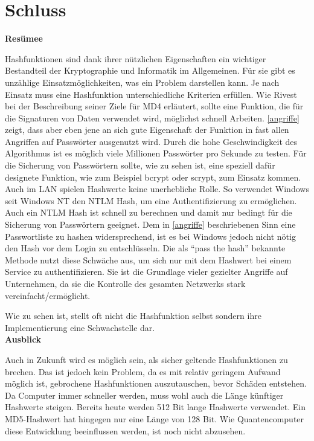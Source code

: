 \documentclass[12pt,a4paper]{scrartcl}
\numberwithin{equation}{section}
\numberwithin{myalgctr}{section}
\numberwithin{mytheoremctr}{section}
\begin{document}
	
	\newpage
	\section{Schluss}
	\textbf{Resümee}\par\noindent
	Hashfunktionen sind dank ihrer nützlichen Eigenschaften ein wichtiger Bestandteil der Kryptographie und Informatik im Allgemeinen. Für sie gibt es unzählige Einsatzmöglichkeiten, was ein Problem darstellen kann. Je nach Einsatz muss eine Hashfunktion unterschiedliche Kriterien erfüllen. Wie Rivest bei der Beschreibung seiner Ziele für MD4 erläutert, sollte eine Funktion, die für die Signaturen von Daten verwendet wird, möglichst schnell Arbeiten. \cref{angriffe} zeigt, dass aber eben jene an sich gute Eigenschaft der Funktion in fast allen Angriffen auf Passwörter ausgenutzt wird. Durch die hohe Geschwindigkeit des Algorithmus ist es möglich viele Millionen Passwörter pro Sekunde zu testen. Für die Sicherung von Passwörtern sollte, wie zu sehen ist, eine speziell dafür designete Funktion, wie zum Beispiel bcrypt oder scrypt, zum Einsatz kommen.\\
	Auch im LAN spielen Hashwerte keine unerhebliche Rolle. So verwendet Windows seit Windows NT den NTLM Hash, um eine Authentifizierung zu ermöglichen. Auch ein NTLM Hash ist schnell zu berechnen und damit nur bedingt für die Sicherung von Passwörtern geeignet. Dem in \cref{angriffe} beschriebenen Sinn eine Passwortliste zu hashen widersprechend, ist es bei Windows jedoch nicht nötig den Hash vor dem Login zu entschlüsseln. Die als \textquotedblleft pass the hash\textquotedblright{} bekannte Methode nutzt diese Schwäche aus, um sich nur mit dem Hashwert bei einem Service zu authentifizieren. Sie ist die Grundlage vieler gezielter Angriffe auf Unternehmen, da sie die Kontrolle des gesamten Netzwerks stark vereinfacht/ermöglicht. \par\vspace*{.5\baselineskip}\noindent
	Wie zu sehen ist, stellt oft nicht die Hashfunktion selbst sondern ihre Implementierung eine Schwachstelle dar.\\
	\newline
	\textbf{Ausblick}\par\noindent
	Auch in Zukunft wird es möglich sein, als sicher geltende Hashfunktionen zu brechen. Das ist jedoch kein Problem, da es mit relativ geringem Aufwand möglich ist, gebrochene Hashfunktionen auszutauschen, bevor Schäden entstehen. Da Computer immer schneller werden, muss wohl auch die Länge künftiger Hashwerte steigen. Bereits heute werden 512 Bit lange Hashwerte verwendet. Ein MD5-Hashwert hat hingegen nur eine Länge von 128 Bit. Wie Quantencomputer diese Entwicklung beeinflussen werden, ist noch nicht abzusehen.
	
\end{document}

